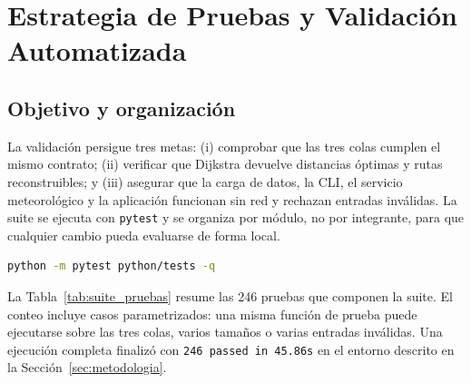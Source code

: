 \section{Estrategia de Pruebas y Validación Automatizada}
\label{sec:pruebas}

\subsection{Objetivo y organización}
La validación persigue tres metas: (i) comprobar que las tres colas cumplen el mismo contrato; (ii) verificar que Dijkstra devuelve distancias óptimas y rutas reconstruibles; y (iii) asegurar que la carga de datos, la CLI, el servicio meteorológico y la aplicación funcionan sin red y rechazan entradas inválidas. La suite se ejecuta con \texttt{pytest} y se organiza por módulo, no por integrante, para que cualquier cambio pueda evaluarse de forma local.

\begin{lstlisting}[language=bash, caption={Ejecución de la suite completa}]
python -m pytest python/tests -q
\end{lstlisting}

La Tabla~\ref{tab:suite_pruebas} resume las 246 pruebas que componen la suite. El conteo incluye casos parametrizados: una misma función de prueba puede ejecutarse sobre las tres colas, varios tamaños o varias entradas inválidas. Una ejecución completa finalizó con \texttt{246 passed in 45.86s} en el entorno descrito en la Sección~\ref{sec:metodologia}.

